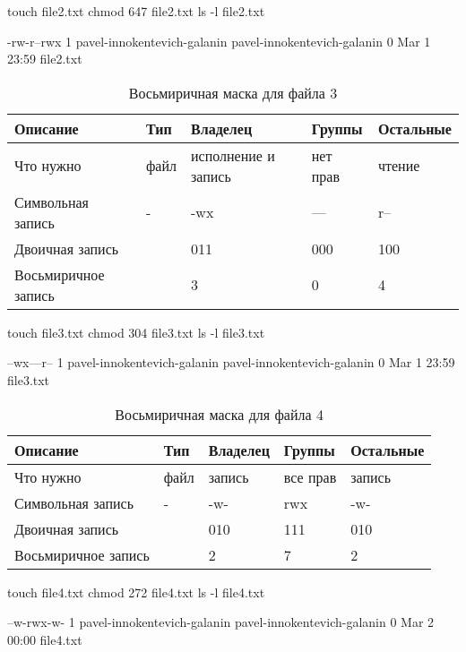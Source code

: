 \begin{BashBox}
    touch file2.txt
    chmod 647 file2.txt
    ls -l file2.txt
\end{BashBox}

\begin{OutBox}
    -rw-r--rwx 1 pavel-innokentevich-galanin pavel-innokentevich-galanin 0 Mar  1 23:59 file2.txt
\end{OutBox}

\begin{table}[h!]
    \centering
    \caption{Восьмиричная маска для файла 3}
    \begin{tabular}{ | l | l | l | l | l | }
        \hline
        Описание            & Тип   & Владелец              & Группы    & Остальные \\ \hline
        \hline
        Что нужно           & файл  & исполнение и запись   & нет прав  & чтение    \\ \hline
        Символьная запись 	& -     & -wx 	                & --- 	    & r--       \\ \hline
        Двоичная запись     & 	    & 011 	                & 000 	    & 100       \\ \hline
        Восьмиричное запись & 	    & 3 	                & 0 	    & 4         \\ \hline
    \end{tabular}
\end{table}

\begin{BashBox}
    touch file3.txt
    chmod 304 file3.txt
    ls -l file3.txt
\end{BashBox}

\begin{OutBox}
    --wx---r-- 1 pavel-innokentevich-galanin pavel-innokentevich-galanin 0 Mar  1 23:59 file3.txt
\end{OutBox}

\begin{table}[h!]
    \centering
    \caption{Восьмиричная маска для файла 4}
    \begin{tabular}{ | l | l | l | l | l | }
        \hline
        Описание            & Тип   & Владелец  & Группы    & Остальные \\ \hline
        \hline
        Что нужно           & файл  & запись    & все прав  & запись    \\ \hline
        Символьная запись 	& -     & -w- 	    & rwx 	    & -w-       \\ \hline
        Двоичная запись     & 	    & 010 	    & 111 	    & 010       \\ \hline
        Восьмиричное запись & 	    & 2	        & 7 	    & 2         \\ \hline
    \end{tabular}
\end{table}

\begin{BashBox}
    touch file4.txt
    chmod 272 file4.txt
    ls -l file4.txt
\end{BashBox}

\begin{OutBox}
    --w-rwx-w- 1 pavel-innokentevich-galanin pavel-innokentevich-galanin 0 Mar  2 00:00 file4.txt
\end{OutBox}
